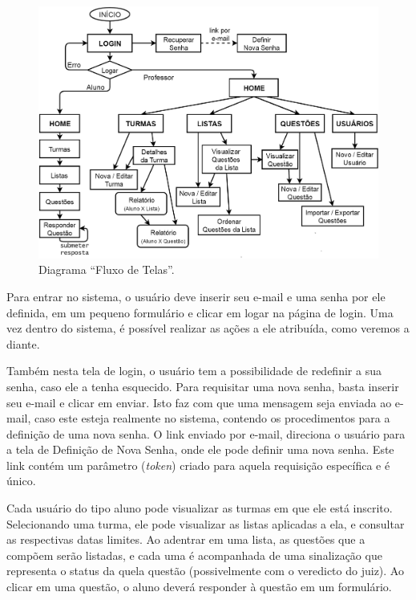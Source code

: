 \documentclass[
	12pt,				%
	openany,
	oneside,
	a4paper,			%
	english,			%
	brazil				%
	]{abntex2}
\begin{document}
\begin{figure} %
  \centering
  \includegraphics[scale=0.35]{fluxoTelas.png}
  \caption{Diagrama ``Fluxo de Telas''.}
  \label{fig:fluxoTelas}
\end{figure}

  Para entrar no sistema, o usuário deve inserir seu e-mail e uma senha por ele definida, em um pequeno formulário e clicar em logar na página de login. Uma vez dentro do sistema, é possível realizar as ações a ele atribuída, como veremos a diante.

  Também nesta tela de login, o usuário tem a possibilidade de redefinir a sua senha, caso ele a tenha esquecido. Para requisitar uma nova senha, basta inserir seu e-mail e clicar em enviar. Isto faz com que uma mensagem seja enviada ao e-mail, caso este esteja realmente no sistema, contendo os procedimentos para a definição de uma nova senha. O link enviado por e-mail, direciona o usuário para a tela de Definição de Nova Senha, onde ele pode definir uma nova senha. Este link contém um parâmetro (\textit{token}) criado para aquela requisição específica e é único.

  Cada usuário do tipo aluno pode visualizar as turmas em que ele está inscrito. Selecionando uma turma, ele pode visualizar as listas aplicadas a ela, e consultar as respectivas datas limites. Ao adentrar em uma lista, as questões que a compõem serão listadas, e cada uma é acompanhada de uma sinalização que representa o status da quela questão (possivelmente com o veredicto do juiz). Ao clicar em uma questão, o aluno deverá responder à questão em um formulário.
\end{document}

